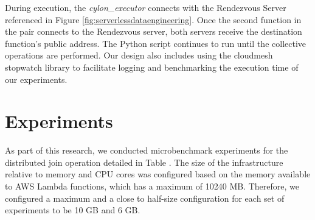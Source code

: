 \documentclass[conference]{IEEEtran}
\begin{document}
During execution, the \textit{cylon\_executor} connects with the Rendezvous Server referenced in Figure \ref{fig:serverlessdataengineering}.  Once the second function in the pair connects to the Rendezvous server, both servers receive the destination function's public address.  The Python script continues to run until the collective operations are performed.  Our design also includes using the cloudmesh stopwatch library to facilitate logging and benchmarking the execution time of our experiments\cite{cloudmeshcommon}.
\section{Experiments}

As part of this research, we conducted microbenchmark experiments for the distributed join operation detailed in Table . The size of the infrastructure relative to memory and CPU cores was configured based on the memory available to AWS Lambda functions, which has a maximum of 10240 MB. Therefore, we configured a maximum and a close to half-size configuration for each set of experiments to be 10 GB and 6 GB.  
\end{document}
